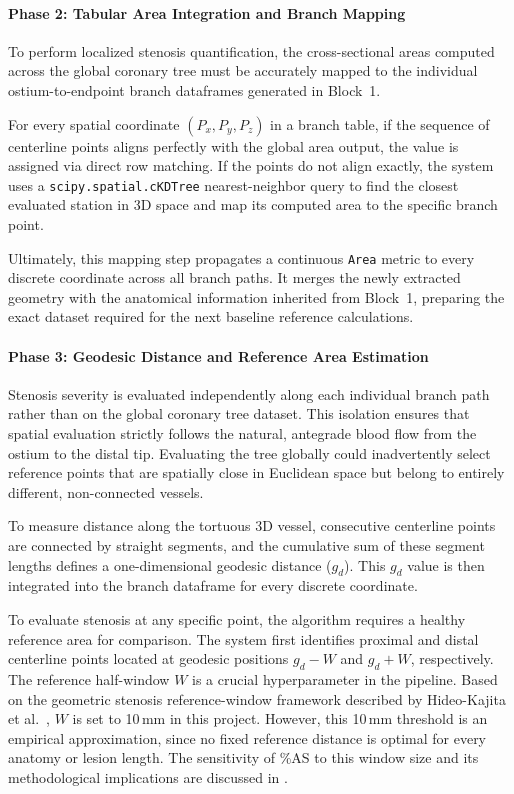 \paragraph{Phase 2: Tabular Area Integration and Branch Mapping}\mbox{}\par\vspace{0.5em}
To perform localized stenosis quantification, the cross-sectional areas computed across the global coronary tree must be accurately mapped to the individual ostium-to-endpoint branch dataframes generated in Block~1.

For every spatial coordinate $(P_x, P_y, P_z)$ in a branch table, if the sequence of centerline points aligns perfectly with the global area output, the value is assigned via direct row matching. If the points do not align exactly, the system uses a \texttt{scipy.spatial.cKDTree} nearest-neighbor query to find the closest evaluated station in 3D space and map its computed area to the specific branch point.

Ultimately, this mapping step propagates a continuous \texttt{Area} metric to every discrete coordinate across all branch paths. It merges the newly extracted geometry with the anatomical information inherited from Block~1, preparing the exact dataset required for the next baseline reference calculations.

\paragraph{Phase 3: Geodesic Distance and Reference Area Estimation}\mbox{}\par\vspace{0.5em}
Stenosis severity is evaluated independently along each individual branch path rather than on the global coronary tree dataset. This isolation ensures that spatial evaluation strictly follows the natural, antegrade blood flow from the ostium to the distal tip. Evaluating the tree globally could inadvertently select reference points that are spatially close in Euclidean space but belong to entirely different, non-connected vessels.

To measure distance along the tortuous 3D vessel, consecutive centerline points are connected by straight segments, and the cumulative sum of these segment lengths defines a one-dimensional geodesic distance ($g_d$). This $g_d$ value is then integrated into the branch dataframe for every discrete coordinate.

To evaluate stenosis at any specific point, the algorithm requires a healthy reference area for comparison. The system first identifies proximal and distal centerline points located at geodesic positions $g_d - W$ and $g_d + W$, respectively. The reference half-window $W$ is a crucial hyperparameter in the pipeline. Based on the geometric stenosis reference-window framework described by Hideo-Kajita et al.~\cite{hideo_kajita2019}, $W$ is set to 10\,mm in this project. However, this 10\,mm threshold is an empirical approximation, since no fixed reference distance is optimal for every anatomy or lesion length. The sensitivity of \%AS to this window size and its methodological implications are discussed in .

